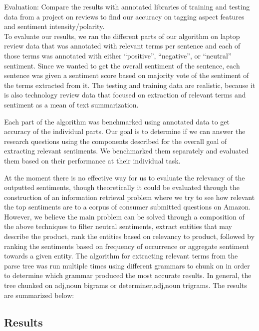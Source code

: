\documentclass{article}
\begin{document}
Evaluation: Compare the results with annotated libraries of training and testing data from a project on reviews to find our accuracy on tagging aspect features and sentiment intensity/polarity.
\newline \\
To evaluate our results, we ran the different parts of our algorithm on laptop review data that was annotated with relevant terms per sentence and each of those terms was annotated with either “positive”, 
“negative”, or “neutral” sentiment. Since we wanted to get the overall sentiment of the sentence, each sentence was given a sentiment score based on majority vote of the sentiment of the terms extracted from it. The testing and training data are realistic, because it is also technology review data that focused on extraction of relevant terms and sentiment as a mean of text summarization.  

Each part of the algorithm was benchmarked using annotated data to get accuracy of the individual parts. Our goal is to determine if we can answer the research questions using the components described for the overall goal of extracting relevant sentiments. We benchmarked them separately and evaluated them based on their performance at their individual task.

At the moment there is no effective way for us to evaluate the relevancy of the outputted sentiments, though theoretically it could be evaluated through the construction of an information retrieval problem where we try to see how relevant the top sentiments are to a corpus of consumer submitted questions on Amazon. However, we believe the main problem can be solved through a composition of the above techniques to filter neutral sentiments, extract entities that may describe the product, rank the entities based on relevancy to product, followed by ranking the sentiments based on frequency of occurrence or aggregate sentiment towards a given entity.  
\newline 
The algorithm for extracting relevant terms from the parse tree was run multiple times using different grammars to chunk on in order to determine which grammar produced the most accurate results. In general, the tree chunked on adj,noun bigrams or determiner,adj,noun trigrams. The results are summarized below: 


\subsection{Results}
\end{document}
